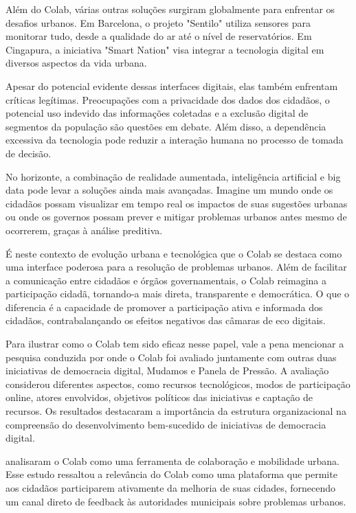 Além do Colab, várias outras soluções surgiram globalmente para enfrentar os desafios urbanos. Em Barcelona, o projeto "Sentilo" utiliza sensores para monitorar tudo, desde a qualidade do ar até o nível de reservatórios. Em Cingapura, a iniciativa "Smart Nation" visa integrar a tecnologia digital em diversos aspectos da vida urbana.

Apesar do potencial evidente dessas interfaces digitais, elas também enfrentam críticas legítimas. Preocupações com a privacidade dos dados dos cidadãos, o potencial uso indevido das informações coletadas e a exclusão digital de segmentos da população são questões em debate. Além disso, a dependência excessiva da tecnologia pode reduzir a interação humana no processo de tomada de decisão.

No horizonte, a combinação de realidade aumentada, inteligência artificial e big data pode levar a soluções ainda mais avançadas. Imagine um mundo onde os cidadãos possam visualizar em tempo real os impactos de suas sugestões urbanas ou onde os governos possam prever e mitigar problemas urbanos antes mesmo de ocorrerem, graças à análise preditiva.

É neste contexto de evolução urbana e tecnológica que o Colab se destaca como uma interface poderosa para a resolução de problemas urbanos. Além de facilitar a comunicação entre cidadãos e órgãos governamentais, o Colab reimagina a participação cidadã, tornando-a mais direta, transparente e democrática. O que o diferencia é a capacidade de promover a participação ativa e informada dos cidadãos, contrabalançando os efeitos negativos das câmaras de eco digitais.

Para ilustrar como o Colab tem sido eficaz nesse papel, vale a pena mencionar a pesquisa conduzida por  onde o Colab foi avaliado juntamente com outras duas iniciativas de democracia digital, Mudamos e Panela de Pressão. A avaliação considerou diferentes aspectos, como recursos tecnológicos, modos de participação online, atores envolvidos, objetivos políticos das iniciativas e captação de recursos. Os resultados destacaram a importância da estrutura organizacional na compreensão do desenvolvimento bem-sucedido de iniciativas de democracia digital.

 analisaram o Colab como uma ferramenta de colaboração e mobilidade urbana. Esse estudo ressaltou a relevância do Colab como uma plataforma que permite aos cidadãos participarem ativamente da melhoria de suas cidades, fornecendo um canal direto de feedback às autoridades municipais sobre problemas urbanos.

